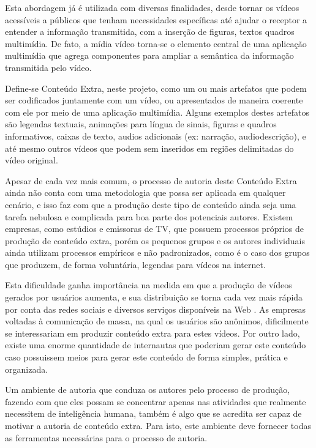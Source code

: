 \documentclass{sig-alternate}
\begin{document}
Esta abordagem já é utilizada com diversas finalidades, desde tornar os vídeos acessíveis a públicos que tenham necessidades específicas até ajudar o receptor a entender a informação transmitida, com a inserção de figuras, textos quadros multimídia. De fato, a mídia vídeo torna-se o elemento central de uma aplicação multimídia que agrega componentes para ampliar a semântica da informação transmitida pelo vídeo.

Define-se Conteúdo Extra, neste projeto, como um ou mais artefatos que podem ser codificados juntamente com um vídeo, ou apresentados de maneira coerente com ele por meio de uma aplicação multimídia. Alguns exemplos destes artefatos são legendas textuais, animações para língua de sinais, figuras e quadros informativos, caixas de texto, audios adicionais (ex: narração, audiodescrição), e até mesmo outros vídeos que podem sem inseridos em regiões delimitadas do vídeo original.

Apesar de cada vez mais comum, o processo de autoria deste Conteúdo Extra ainda não conta com uma metodologia que possa ser aplicada em qualquer cenário, e isso faz com que a produção deste tipo de conteúdo ainda seja uma tarefa nebulosa e complicada para boa parte dos potenciais autores. Existem empresas, como estúdios e emissoras de TV, que possuem processos próprios de produção de conteúdo extra, porém os pequenos grupos e os autores individuais ainda utilizam processos empíricos e não padronizados, como é o caso dos grupos que produzem, de forma voluntária, legendas para vídeos na internet.

Esta dificuldade ganha importância na medida em que a produção de vídeos gerados por usuários aumenta, e sua distribuição se torna cada vez mais rápida por conta das redes sociais e diversos serviços disponíveis na Web \cite{Fontanini2016}. As empresas voltadas à comunicação de massa, na qual os usuários são anônimos, dificilmente se interessariam em produzir conteúdo extra para estes vídeos. Por outro lado, existe uma enorme quantidade de internautas que poderiam gerar este conteúdo caso possuissem meios para gerar este conteúdo de forma simples, prática e organizada.

Um ambiente de autoria que conduza os autores pelo processo de produção, fazendo com que eles possam se concentrar apenas nas atividades que realmente necessitem de inteligência humana, também é algo que se acredita ser capaz de motivar a autoria de conteúdo extra. Para isto, este ambiente deve fornecer todas as ferramentas necessárias para o processo de autoria.
\end{document}
